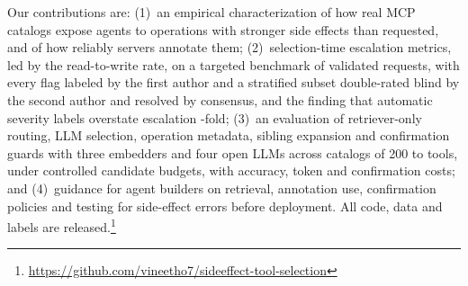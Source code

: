 \noindent Our contributions are:
(1)~an empirical characterization of how real MCP catalogs expose agents to operations with
stronger side effects than requested, and of how reliably servers annotate them;
(2)~selection-time escalation metrics, led by the read-to-write rate, on a targeted benchmark of
\NumQueries{} validated requests, with every flag labeled by the first author and a stratified subset double-rated blind by the
second author and resolved by consensus, and the finding that automatic
severity labels overstate escalation \EscOverstate-fold;
(3)~an evaluation of retriever-only routing, LLM selection, operation metadata, sibling expansion
and confirmation guards with three embedders and four open LLMs across catalogs of 200 to
\NumPoolTools{} tools, under controlled candidate budgets, with accuracy, token and confirmation
costs; and
(4)~guidance for agent builders on retrieval, annotation use, confirmation policies and testing
for side-effect errors before deployment.
All code, data and labels are released.\footnote{\url{https://github.com/vineetho7/sideeffect-tool-selection}}
